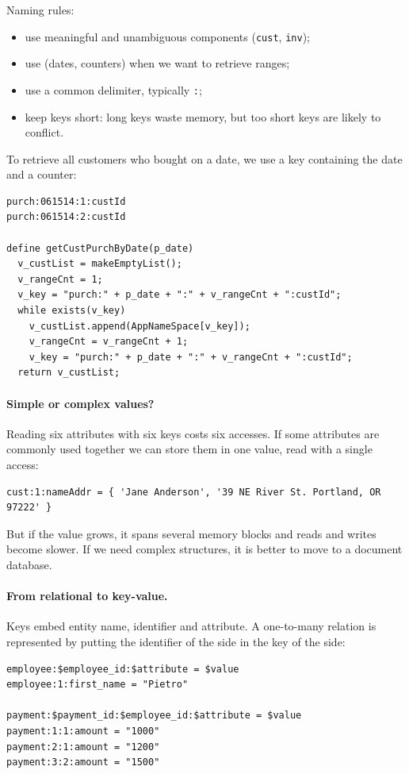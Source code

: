 Naming rules:
\begin{itemize}
  \item use meaningful and unambiguous components (\texttt{cust}, \texttt{inv});
  \item use  (dates, counters) when we want to retrieve ranges;
  \item use a common delimiter, typically \texttt{:};
  \item keep keys short: long keys waste memory, but too short keys are likely to conflict.
\end{itemize}

\begin{example}
To retrieve all customers who bought on a date, we use a key containing the date and a counter:
\begin{lstlisting}
purch:061514:1:custId
purch:061514:2:custId

define getCustPurchByDate(p_date)
  v_custList = makeEmptyList();
  v_rangeCnt = 1;
  v_key = "purch:" + p_date + ":" + v_rangeCnt + ":custId";
  while exists(v_key)
    v_custList.append(AppNameSpace[v_key]);
    v_rangeCnt = v_rangeCnt + 1;
    v_key = "purch:" + p_date + ":" + v_rangeCnt + ":custId";
  return v_custList;
\end{lstlisting}
\end{example}

\paragraph{Simple or complex values?} Reading six attributes with six keys costs six accesses. If some attributes are commonly used together we can store them in one value, read with a single access:
\begin{lstlisting}
cust:1:nameAddr = { 'Jane Anderson', '39 NE River St. Portland, OR 97222' }
\end{lstlisting}
But if the value grows, it spans several memory blocks and reads and writes become slower. If we need complex structures, it is better to move to a document database.

\paragraph{From relational to key-value.} Keys embed entity name, identifier and attribute. A one-to-many relation is represented by putting the identifier of the  side in the key of the  side:
\begin{lstlisting}
employee:$employee_id:$attribute = $value
employee:1:first_name = "Pietro"

payment:$payment_id:$employee_id:$attribute = $value
payment:1:1:amount = "1000"
payment:2:1:amount = "1200"
payment:3:2:amount = "1500"
\end{lstlisting}

